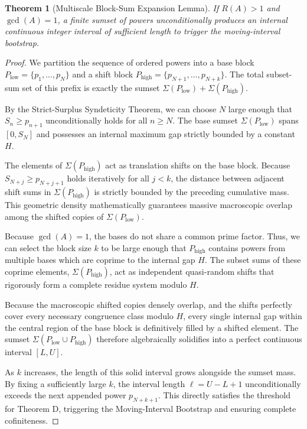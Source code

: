 \documentclass[12pt,reqno]{amsart}
\newtheorem{theorem}{Theorem}[section]
\theoremstyle{definition}
\begin{document}
\begin{theorem}[Multiscale Block-Sum Expansion Lemma]
If $R(A) > 1$ and $\gcd(A) = 1$, a finite sumset of powers unconditionally produces an internal continuous integer interval of sufficient length to trigger the moving-interval bootstrap.
\end{theorem}

\begin{proof}
We partition the sequence of ordered powers into a base block $P_{\text{low}} = \{p_1, \dots, p_N\}$ and a shift block $P_{\text{high}} = \{p_{N+1}, \dots, p_{N+k}\}$. The total subset-sum set of this prefix is exactly the sumset $\Sigma(P_{\text{low}}) + \Sigma(P_{\text{high}})$.

By the Strict-Surplus Syndeticity Theorem, we can choose $N$ large enough that $S_n \ge p_{n+1}$ unconditionally holds for all $n \ge N$. The base sumset $\Sigma(P_{\text{low}})$ spans $[0, S_N]$ and possesses an internal maximum gap strictly bounded by a constant $H$.

The elements of $\Sigma(P_{\text{high}})$ act as translation shifts on the base block. Because $S_{N+j} \ge p_{N+j+1}$ holds iteratively for all $j < k$, the distance between adjacent shift sums in $\Sigma(P_{\text{high}})$ is strictly bounded by the preceding cumulative mass. This geometric density mathematically guarantees massive macroscopic overlap among the shifted copies of $\Sigma(P_{\text{low}})$.

Because $\gcd(A) = 1$, the bases do not share a common prime factor. Thus, we can select the block size $k$ to be large enough that $P_{\text{high}}$ contains powers from multiple bases which are coprime to the internal gap $H$. The subset sums of these coprime elements, $\Sigma(P_{\text{high}})$, act as independent quasi-random shifts that rigorously form a complete residue system modulo $H$.

Because the macroscopic shifted copies densely overlap, and the shifts perfectly cover every necessary congruence class modulo $H$, every single internal gap within the central region of the base block is definitively filled by a shifted element. The sumset $\Sigma(P_{\text{low}} \cup P_{\text{high}})$ therefore algebraically solidifies into a perfect continuous interval $[L, U]$.

As $k$ increases, the length of this solid interval grows alongside the sumset mass. By fixing a sufficiently large $k$, the interval length $\ell = U - L + 1$ unconditionally exceeds the next appended power $p_{N+k+1}$. This directly satisfies the threshold for Theorem D, triggering the Moving-Interval Bootstrap and ensuring complete cofiniteness.
\end{proof}
\end{document}
